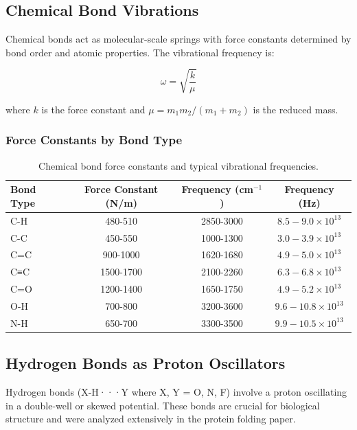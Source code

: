 
\subsection{Chemical Bond Vibrations}

Chemical bonds act as molecular-scale springs with force constants determined by bond order and atomic properties. The vibrational frequency is:

\begin{equation}
\omega = \sqrt{\frac{k}{\mu}}
\end{equation}

where $k$ is the force constant and $\mu = m_1m_2/(m_1 + m_2)$ is the reduced mass.

\subsubsection{Force Constants by Bond Type}

\begin{table}[h]
\centering
\begin{tabular}{|l|c|c|c|}
\hline
\textbf{Bond Type} & \textbf{Force Constant (N/m)} & \textbf{Frequency (cm$^{-1}$)} & \textbf{Frequency (Hz)} \\
\hline
C-H & 480-510 & 2850-3000 & $8.5-9.0 \times 10^{13}$ \\
C-C & 450-550 & 1000-1300 & $3.0-3.9 \times 10^{13}$ \\
C=C & 900-1000 & 1620-1680 & $4.9-5.0 \times 10^{13}$ \\
C≡C & 1500-1700 & 2100-2260 & $6.3-6.8 \times 10^{13}$ \\
C=O & 1200-1400 & 1650-1750 & $4.9-5.2 \times 10^{13}$ \\
O-H & 700-800 & 3200-3600 & $9.6-10.8 \times 10^{13}$ \\
N-H & 650-700 & 3300-3500 & $9.9-10.5 \times 10^{13}$ \\
\hline
\end{tabular}
\caption{Chemical bond force constants and typical vibrational frequencies.}
\end{table}

\subsection{Hydrogen Bonds as Proton Oscillators}

Hydrogen bonds (X-H···Y where X, Y = O, N, F) involve a proton oscillating in a double-well or skewed potential. These bonds are crucial for biological structure and were analyzed extensively in the protein folding paper.

